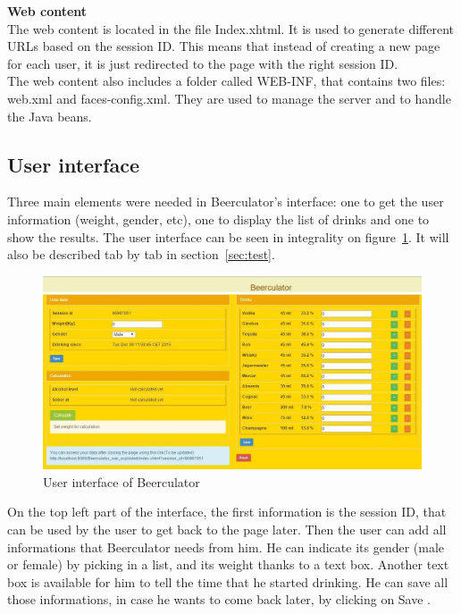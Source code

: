 {\bf Web content}\\
The web content is located in the file Index.xhtml. It is used to generate different URLs based on the session ID. This means that instead of creating a new page for each user, it is just redirected to the page with the right session ID.\\

The web content also includes a folder called WEB-INF, that contains two files: web.xml and faces-config.xml. They are used to manage the server and to handle the Java beans.

\subsection{User interface}
\label{ssec:ui}

Three main elements were needed in Beerculator's interface: one to get the user information (weight, gender, etc), one to display the list of drinks and one to show the results. The user interface can be seen in integrality on {\sc figure}~\ref{fig:ui}. It will also be described tab by tab in {\sc section}~\ref{sec:test}.\\

\begin{figure}[H]
\centering
   \includegraphics[scale=0.65]{./figures/ui.jpg}
   \caption{User interface of Beerculator}
   \label{fig:ui}
\end{figure}

On the top left part of the interface, the first information is the session ID, that can be used by the user to get back to the page later. Then the user can add all informations that Beerculator needs from him. He can indicate its gender (male or female) by picking in a list, and its weight thanks to a text box. Another text box is available for him to tell the time that he started drinking. He can save all those informations, in case he wants to come back later, by clicking on \guillemotleft{} Save \guillemotright{}.\\

